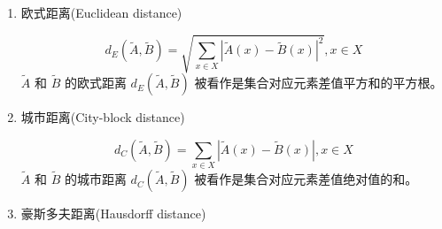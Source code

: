 \begin{enumerate}[(1)]
    \item 欧式距离(Euclidean distance)

          \begin{equation}
              \label{equ:eucliden}
              d_E(\tilde{A}, \tilde{B}) = \sqrt{\sum_{x \in X} |\tilde{A}(x)-\tilde{B}(x)|^2 }, x \in X
          \end{equation}
          $\tilde{A}$ 和 $\tilde{B}$ 的欧式距离 $d_E(\tilde{A}, \tilde{B})$ 被看作是集合对应元素差值平方和的平方根。
    \item 城市距离(City-block distance)

          \begin{equation}
              \label{equ:cityblock}
              d_C(\tilde{A}, \tilde{B}) = \sum_{x \in X}|\tilde{A}(x)-\tilde{B}(x)| , x \in X
          \end{equation}
          $\tilde{A}$ 和 $\tilde{B}$ 的城市距离 $d_C(\tilde{A}, \tilde{B})$ 被看作是集合对应元素差值绝对值的和。

    \item 豪斯多夫距离(Hausdorff distance)


\end{enumerate}
